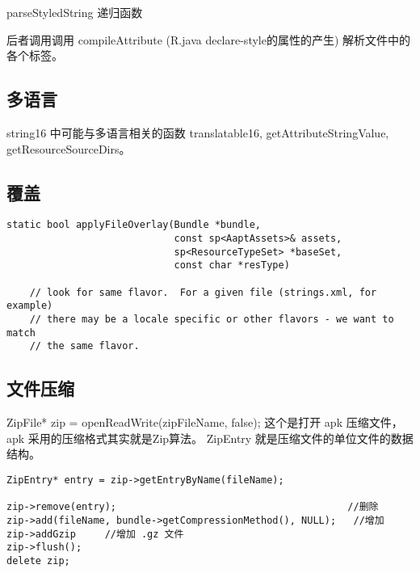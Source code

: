 \documentclass[a4paper,11pt]{article}
\begin{document}
parseStyledString 
递归函数

 后者调用调用 compileAttribute (R.java declare-style的属性的产生)
解析文件中的各个标签。

\subsection{多语言}
string16 中可能与多语言相关的函数 translatable16, getAttributeStringValue,
getResourceSourceDirs。

\subsection{覆盖}
\begin{lstlisting}
static bool applyFileOverlay(Bundle *bundle,
                             const sp<AaptAssets>& assets,
                             sp<ResourceTypeSet> *baseSet,
                             const char *resType)

    // look for same flavor.  For a given file (strings.xml, for example)
    // there may be a locale specific or other flavors - we want to match
    // the same flavor.
\end{lstlisting}

\subsection{文件压缩}
ZipFile* zip = openReadWrite(zipFileName, false);
这个是打开 apk 压缩文件，apk 采用的压缩格式其实就是Zip算法。
ZipEntry 就是压缩文件的单位文件的数据结构。

\begin{lstlisting}
ZipEntry* entry = zip->getEntryByName(fileName);

zip->remove(entry);                                        //删除 
zip->add(fileName, bundle->getCompressionMethod(), NULL);   //增加 
zip->addGzip     //增加 .gz 文件 
zip->flush(); 
delete zip;
\end{lstlisting}

\begin{comment}


frameworks/base/libs/utils/Asset.cpp      _CompressedAsset::getBuffer   
frameworks/base/include/utils/Asset.h      UNCOMPRESS_DATA_MAX 


ResourceTable.cpp  函数 compileAttribute、compileResourceFile、compileXmlFile 
compileResourceFile、parsePackage 等解析 XML 文件的函数都要调用

platform$ find sdk | xargs grep --color -n -e "android.libraries.res"
sdk/anttasks/src/com/android/ant/SetupTask.java:551:            antProject.addReference("android.libraries.res", resPath);
sdk/anttasks/src/com/android/ant/AaptExecLoopTask.java:368:        Object libSrc = taskProject.getReference("android.libraries.res");
sdk/anttasks/src/com/android/ant/AaptExecLoopTask.java:399:        Object libPath = taskProject.getReference("android.libraries.res");

sdk/anttasks/src/com/android/ant/AaptExecLoopTask.java:301:     private void callAapt(String customPackage) {
  \end{comment}
\end{document}
